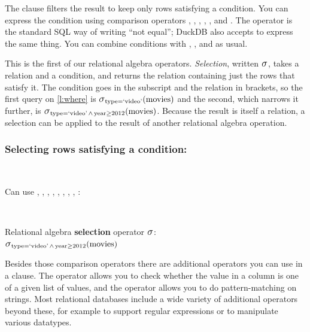 The  clause filters the result to keep only rows satisfying a condition.
You can express the condition using comparison operators \code{=}, \code{<}, \code{<=}, \code{>}, \code{>=}, and \code{<>}.
The \code{<>} operator is the standard SQL way of writing ``not equal''; DuckDB also accepts \code{!=} to express the same thing.
You can combine conditions with , , and  as usual.

This is the first of our relational algebra operators.
\emph{Selection}, written $\raop{\sigma}$, takes a relation and a condition, and returns the relation containing just the rows that satisfy it.
The condition goes in the subscript and the relation in brackets, so the first query on \autoref{l:where} is $\raop{\sigma}_{\ra{type} = \text{`video'}}(\ra{movies})$ and the second, which narrows it further, is $\raop{\sigma}_{\ra{type} = \text{`video'} \,\wedge\, \ra{year} \ge 2012}(\ra{movies})$.
Because the result is itself a relation, a selection can be applied to the result of another relational algebra operation.

\begin{frame}
    \label{s:where}
    \frametitle{Selecting rows satisfying a condition: }
    \inputminted[fontsize=\footnotesize]{sql}{code/sel-4-where.sql}
    \vspace{0.2em}
    {\scriptsize\setlength{\tabcolsep}{3pt}}\\[0.6em]\pause
    Can use \code{=}, \code{<}, \code{<=}, \code{>}, \code{>=}, \code{<>}, , , :
    \inputminted[fontsize=\footnotesize]{sql}{code/sel-4b-where2.sql}
    \vspace{0.2em}
    {\scriptsize\setlength{\tabcolsep}{3pt}}\\[0.6em]\pause
    Relational algebra \textbf{selection} operator $\raop{\sigma}$:\\[0.3em]
    \hspace*{1em}$\raop{\sigma}_{\ra{type} = \text{`video'} \,\wedge\, \ra{year} \ge 2012}(\ra{movies})$
\end{frame}
\label{l:where}

Besides those comparison operators there are additional operators you can use in a  clause.
The  operator allows you to check whether the value in a column is one of a given list of values, and the  operator allows you to do pattern-matching on strings.
Most relational databases include a wide variety of additional operators beyond these, for example to support regular expressions or to manipulate various datatypes.

